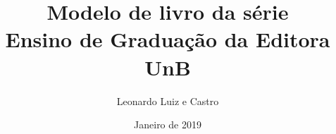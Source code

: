 \documentclass{book}
\title{Modelo de livro da série \\ Ensino de Graduação da Editora UnB}
\author{Leonardo Luiz e Castro} %
\date{Janeiro de 2019}
\makeatletter
\renewcommand\mainmatter{%
  \cleardoublepage
  \@mainmattertrue
  \renewcommand{\thepage}{\arabic{page}}
}
\makeatother
\begin{document}

\makeatletter
\renewcommand{\@pnumwidth}{2.0em}
\renewcommand{\@tocrmarg}{2.7em}
\makeatother


\frontmatter



\clearpage


\clearpage


\clearpage


\clearpage


\cleardoublepage


\cleardoublepage



\cleardoublepage


\listoffigures \thispagestyle{empty}
\cleardoublepage


\listoftables \thispagestyle{empty}
\cleardoublepage


\tableofcontents\thispagestyle{empty}
\cleardoublepage 


\mainmatter


\cleardoublepage


\clearpage

\cleardoublepage


\cleardoublepage


\cleardoublepage


\renewcommand\appendixname{APÊNDICE}
\renewcommand\appendixpagename{APÊNDICES}
\renewcommand{\appendixtocname}{APÊNDICES}

\begin{appendices}




\cleardoublepage


\cleardoublepage

\end{appendices}
\end{document}
